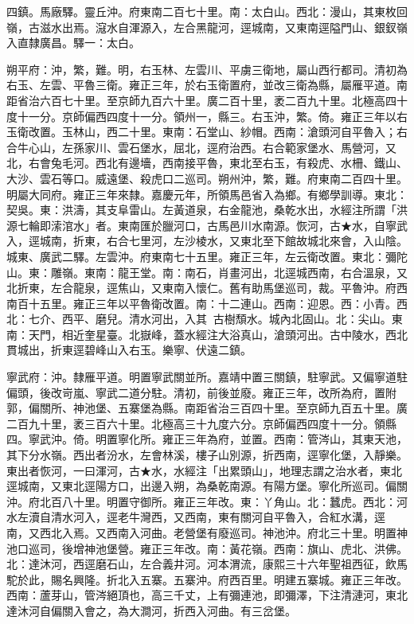 \begin{pinyinscope}
四鎮。馬廠驛。靈丘沖。府東南二百七十里。南：太白山。西北：漫山，其東枚回嶺，古滋水出焉。滱水自渾源入，左合黑龍河，逕城南，又東南逕隘門山、銀釵嶺入直隸廣昌。驛一：太白。

朔平府：沖，繁，難。明，右玉林、左雲川、平虜三衛地，屬山西行都司。清初為右玉、左雲、平魯三衛。雍正三年，於右玉衛置府，並改三衛為縣，屬雁平道。南距省治六百七十里。至京師九百六十里。廣二百十里，袤二百九十里。北極高四十度十一分。京師偏西四度十一分。領州一，縣三。右玉沖，繁。倚。雍正三年以右玉衛改置。玉林山，西二十里。東南：石堂山、紗帽。西南：滄頭河自平魯入；右合牛心山，左孫家川、雲石堡水，屈北，逕府治西。右合範家堡水、馬營河，又北，右會兔毛河。西北有邊墻，西南接平魯，東北至右玉，有殺虎、水柵、鐵山、大沙、雲石等口。威遠堡、殺虎口二巡司。朔州沖，繁，難。府東南二百四十里。明屬大同府。雍正三年來隸。嘉慶元年，所領馬邑省入為鄉。有鄉學訓導。東北：契吳。東：洪濤，其支阜雷山。左黃道泉，右金龍池，桑乾水出，水經注所謂「洪源七輪即溹涫水」者。東南匯於臘河口，古馬邑川水南源。恢河，古★水，自寧武入，逕城南，折東，右合七里河，左沙棱水，又東北至下館故城北來會，入山陰。城東、廣武二驛。左雲沖。府東南七十五里。雍正三年，左云衛改置。東北：彌陀山。東：雕嶺。東南：龍王堂。南：南石，肖畫河出，北逕城西南，右合溫泉，又北折東，左合龍泉，逕焦山，又東南入懷仁。舊有助馬堡巡司，裁。平魯沖。府西南百十五里。雍正三年以平魯衛改置。南：十二連山。西南：迎恩。西：小青。西北：七介、西平、磨兒。清水河出，入其，古樹頹水。城內北固山。北：尖山。東南：天門，相近奎星臺。北嶽峰，蓋水經注大浴真山，滄頭河出。古中陵水，西北貫城出，折東逕碧峰山入右玉。樂寧、伏遠二鎮。

寧武府：沖。隸雁平道。明置寧武關並所。嘉靖中置三關鎮，駐寧武。又偏寧道駐偏頭，後改岢嵐、寧武二道分駐。清初，前後並廢。雍正三年，改所為府，置附郭，偏關所、神池堡、五寨堡為縣。南距省治三百四十里。至京師九百五十里。廣二百九十里，袤三百六十里。北極高三十九度六分。京師偏西四度十一分。領縣四。寧武沖。倚。明置寧化所。雍正三年為府，並置。西南：管涔山，其東天池，其下分水嶺。西出者汾水，左會林溪，樓子山別源，折西南，逕寧化堡，入靜樂。東出者恢河，一曰渾河，古★水，水經注「出累頭山」，地理志謂之治水者，東北逕城南，又東北逕陽方口，出邊入朔，為桑乾南源。有陽方堡。寧化所巡司。偏關沖。府北百八十里。明置守御所。雍正三年改。東：丫角山。北：蠶虎。西北：河水左瀆自清水河入，逕老牛灣西，又西南，東有關河自平魯入，合紅水溝，逕南，又西北入焉。又西南入河曲。老營堡有廢巡司。神池沖。府北三十里。明置神池口巡司，後增神池堡營。雍正三年改。南：黃花嶺。西南：旗山、虎北、洪佛。北：達沐河，西逕磨石山，左合義井河。河本渭流，康熙三十六年聖祖西征，飲馬駝於此，賜名興隆。折北入五寨。五寨沖。府西百里。明建五寨城。雍正三年改。西南：蘆芽山，管涔絕頂也，高三千丈，上有彌連池，即彌澤，下注清漣河，東北達沐河自偏關入會之，為大澗河，折西入河曲。有三岔堡。


\end{pinyinscope}
